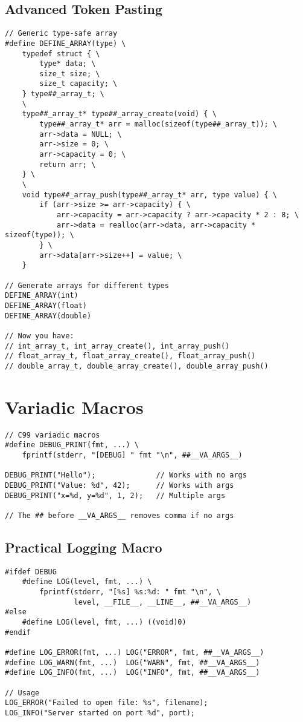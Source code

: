 \subsection{Advanced Token Pasting}

\begin{lstlisting}
// Generic type-safe array
#define DEFINE_ARRAY(type) \
    typedef struct { \
        type* data; \
        size_t size; \
        size_t capacity; \
    } type##_array_t; \
    \
    type##_array_t* type##_array_create(void) { \
        type##_array_t* arr = malloc(sizeof(type##_array_t)); \
        arr->data = NULL; \
        arr->size = 0; \
        arr->capacity = 0; \
        return arr; \
    } \
    \
    void type##_array_push(type##_array_t* arr, type value) { \
        if (arr->size >= arr->capacity) { \
            arr->capacity = arr->capacity ? arr->capacity * 2 : 8; \
            arr->data = realloc(arr->data, arr->capacity * sizeof(type)); \
        } \
        arr->data[arr->size++] = value; \
    }

// Generate arrays for different types
DEFINE_ARRAY(int)
DEFINE_ARRAY(float)
DEFINE_ARRAY(double)

// Now you have:
// int_array_t, int_array_create(), int_array_push()
// float_array_t, float_array_create(), float_array_push()
// double_array_t, double_array_create(), double_array_push()
\end{lstlisting}

\section{Variadic Macros}

\begin{lstlisting}
// C99 variadic macros
#define DEBUG_PRINT(fmt, ...) \
    fprintf(stderr, "[DEBUG] " fmt "\n", ##__VA_ARGS__)

DEBUG_PRINT("Hello");              // Works with no args
DEBUG_PRINT("Value: %d", 42);      // Works with args
DEBUG_PRINT("x=%d, y=%d", 1, 2);   // Multiple args

// The ## before __VA_ARGS__ removes comma if no args
\end{lstlisting}

\subsection{Practical Logging Macro}

\begin{lstlisting}
#ifdef DEBUG
    #define LOG(level, fmt, ...) \
        fprintf(stderr, "[%s] %s:%d: " fmt "\n", \
                level, __FILE__, __LINE__, ##__VA_ARGS__)
#else
    #define LOG(level, fmt, ...) ((void)0)
#endif

#define LOG_ERROR(fmt, ...) LOG("ERROR", fmt, ##__VA_ARGS__)
#define LOG_WARN(fmt, ...)  LOG("WARN", fmt, ##__VA_ARGS__)
#define LOG_INFO(fmt, ...)  LOG("INFO", fmt, ##__VA_ARGS__)

// Usage
LOG_ERROR("Failed to open file: %s", filename);
LOG_INFO("Server started on port %d", port);
\end{lstlisting}

